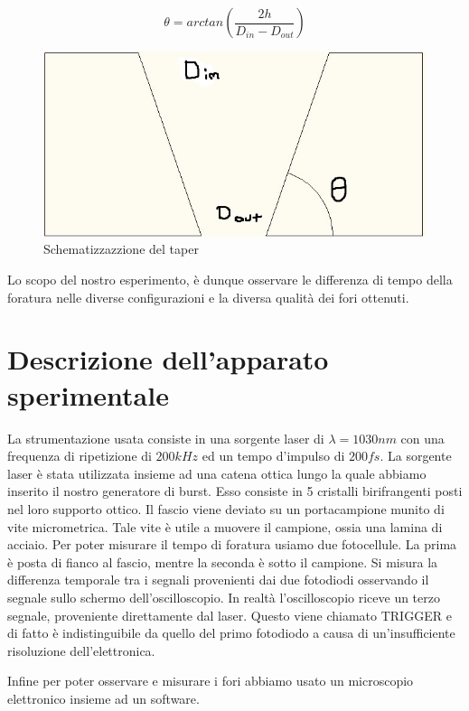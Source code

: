 \documentclass{article}
\begin{document}
\begin{equation}
    \theta=arctan(\frac{2h}{D_{in}-D_{out}})
\end{equation}

\begin{figure}[h!]
    \centering
    \includegraphics[width=\linewidth]{taper.jpg}
    \caption{Schematizzazzione del taper}
    \label{fig:taper}
\end{figure}
Lo scopo del nostro esperimento, è dunque osservare le differenza di tempo della foratura nelle diverse configurazioni e la diversa qualità dei fori ottenuti.
~
\section{Descrizione dell'apparato sperimentale}
La strumentazione usata consiste in una sorgente laser di $\lambda=1030nm$ con una frequenza di ripetizione di $200kHz$ ed un tempo d'impulso di $200fs$. La sorgente laser è stata utilizzata insieme ad una catena ottica lungo la quale abbiamo inserito il nostro generatore di burst. Esso consiste in 5 cristalli birifrangenti posti nel loro supporto ottico. Il fascio viene deviato su un portacampione munito di vite micrometrica. Tale vite è utile a muovere il campione, ossia una lamina di acciaio. Per poter misurare il tempo di foratura usiamo due fotocellule. La prima è posta di fianco al fascio, mentre la seconda è sotto il campione. Si misura la differenza temporale tra i segnali provenienti dai due fotodiodi osservando il segnale sullo schermo dell'oscilloscopio.
In realtà l'oscilloscopio riceve un terzo segnale, proveniente direttamente dal laser. Questo viene chiamato TRIGGER e di fatto è indistinguibile da quello del primo fotodiodo a causa di un'insufficiente risoluzione dell'elettronica.

Infine per poter osservare e misurare i fori abbiamo usato un microscopio elettronico insieme ad un software.
\end{document}
